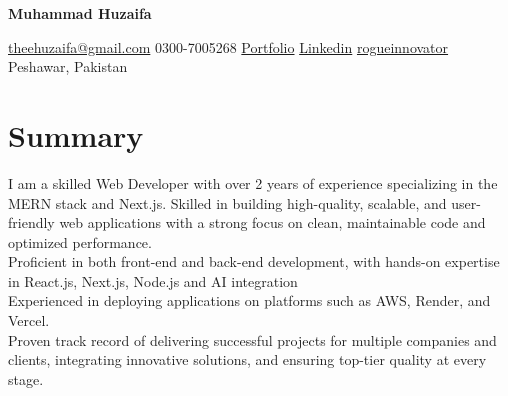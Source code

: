 \documentclass[10pt, letterpaper]{article}
\newenvironment{header}{
    \setlength{\topsep}{0pt}\par\kern\topsep\centering\color{primaryColor}\linespread{1.5}
}{
    \par\kern\topsep
}
\let\hrefWithoutArrow\href
\renewcommand{\href}[2]{\hrefWithoutArrow{#1}{\ifthenelse{\equal{#2}{}}{ }{#2 }\raisebox{.15ex}{\footnotesize \faExternalLink*}}}
\begin{document}
\newcommand{\AND}{\unskip
	\cleaders\copy\ANDbox\hskip\wd\ANDbox
	\ignorespaces
}
\newsavebox\ANDbox
\sbox\ANDbox{}

\begin{header}
	\centering
	\fontsize{30pt}{30pt}\selectfont
	\textbf{Muhammad Huzaifa}

	\vspace{0.4cm}

	\normalsize
	\hrefWithoutArrow{mailto:theehuzaifa@gmail.com}{{\faEnvelope[regular]}\hspace{0.01cm} theehuzaifa@gmail.com} \quad
	{\faPhone*} \hspace{0.01cm} 0300-7005268 \quad
	\hrefWithoutArrow{https://portfolio-nine-fawn-23.vercel.app/}{{\faLink}\hspace{0.01cm} Portfolio} \quad
	\hrefWithoutArrow{https://www.linkedin.com/in/muhammad-huzaifa-ali-49aa94259/}{{\faLinkedinIn} \hspace{0.01cm}  Linkedin} \quad
	\hrefWithoutArrow{https://github.com/rogueinnovator}{{\faGithub}\hspace{0.01cm}  rogueinnovator} \quad
	{\faMapMarker*} Peshawar, Pakistan
\end{header}
\vspace{0.3 cm - 0.3 cm}
\section{Summary}
\noindent
I am a skilled Web Developer with over 2 years of experience specializing in the MERN stack and Next.js. Skilled in building high-quality, scalable, and user-friendly web applications with a strong focus on clean, maintainable code and optimized performance.\\[4pt]
\noindent
Proficient in both front-end and back-end development, with hands-on expertise in React.js, Next.js, Node.js and AI integration\\ Experienced in deploying applications on platforms such as AWS, Render, and Vercel.\\[4pt]
\noindent
Proven track record of delivering successful projects for multiple companies and clients, integrating innovative solutions, and ensuring top-tier quality at every stage.
\end{document}
